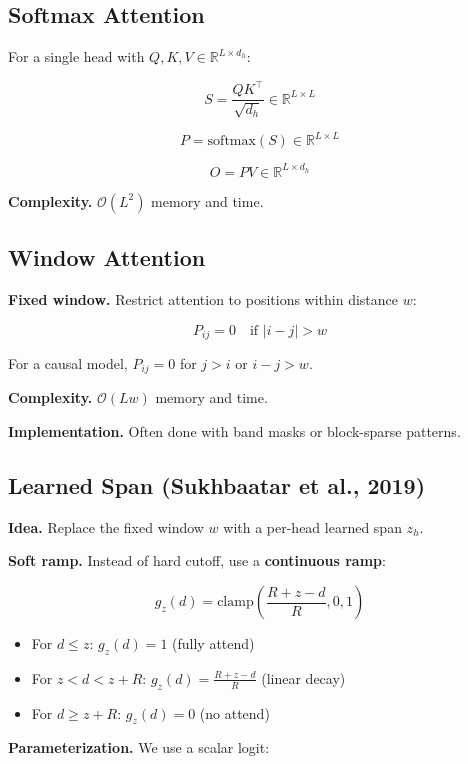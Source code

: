 \subsection{Softmax Attention}

For a single head with $Q, K, V \in \mathbb{R}^{L \times d_h}$:

\[
S = \frac{Q K^\top}{\sqrt{d_h}} \in \mathbb{R}^{L \times L}
\]

\[
P = \text{softmax}(S) \in \mathbb{R}^{L \times L}
\]

\[
O = P V \in \mathbb{R}^{L \times d_h}
\]

\textbf{Complexity.} $\mathcal{O}(L^2)$ memory and time.

\subsection{Window Attention}

\textbf{Fixed window.} Restrict attention to positions within distance $w$:

\[
P_{ij} = 0 \quad \text{if } |i - j| > w
\]

For a causal model, $P_{ij} = 0$ for $j > i$ or $i - j > w$.

\textbf{Complexity.} $\mathcal{O}(L w)$ memory and time.

\textbf{Implementation.} Often done with band masks or block-sparse patterns.

\subsection{Learned Span (Sukhbaatar et al., 2019)}

\textbf{Idea.} Replace the fixed window $w$ with a per-head learned span $z_h$.

\textbf{Soft ramp.} Instead of hard cutoff, use a \textbf{continuous ramp}:

\[
g_z(d) = \text{clamp}\!\left(\frac{R + z - d}{R}, 0, 1\right)
\]

\begin{itemize}
\item For $d \leq z$: $g_z(d) = 1$ (fully attend)
\item For $z < d < z + R$: $g_z(d) = \frac{R + z - d}{R}$ (linear decay)
\item For $d \geq z + R$: $g_z(d) = 0$ (no attend)

\end{itemize}
\textbf{Parameterization.} We use a scalar logit:

